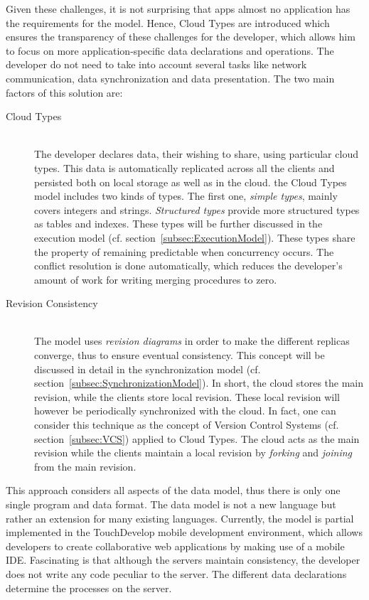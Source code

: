 \documentclass[a4paper,12pt]{report}
\begin{document}
Given these challenges, it is not surprising that apps almost no application has the requirements for the model. Hence, Cloud Types are introduced which ensures the transparency of these challenges for the developer, which allows him to focus on more application-specific data declarations and operations. The developer do not need to take into account several tasks like network communication, data synchronization and data presentation. The two main factors of this solution are:

\begin{description}
 \item[Cloud Types] \hfill \\The developer declares data, their wishing to share, using particular cloud types. This data is automatically replicated across all the clients and persisted both on local storage as well as in the cloud. the Cloud Types model includes two kinds of types. The first one, \textit{simple types}, mainly covers integers and strings. \textit{Structured types} provide more structured types as tables and indexes. These types will be further discussed in the execution model (cf. section~\ref{subsec:ExecutionModel}). These types share the property of remaining predictable when concurrency occurs. The conflict resolution is done automatically, which reduces the developer's amount of work for writing merging procedures to zero.
 \item[Revision Consistency] \hfill \\ The model uses \textit{revision diagrams} in order to make the different replicas converge, thus to ensure eventual consistency. This concept will be discussed in detail in the synchronization model (cf. section~\ref{subsec:SynchronizationModel}). In short, the cloud stores the main revision, while the clients store local revision. These local revision will however be periodically synchronized with the cloud. In fact, one can consider this technique as the concept of Version Control Systems (cf. section~\ref{subsec:VCS}) applied to Cloud Types. The cloud acts as the main revision while the clients maintain a local revision by \textit{forking} and \textit{joining} from the main revision.
\end{description} 

This approach considers all aspects of the data model, thus there is only one single program and data format. The data model is not a new language but rather an extension for many existing languages. Currently, the model is partial implemented in the TouchDevelop mobile development environment, which allows developers to create collaborative web applications by making use of a mobile IDE. Fascinating is that although the servers maintain consistency, the developer does not write any code peculiar to the server. The different data declarations determine the processes on the server. 
\end{document}
